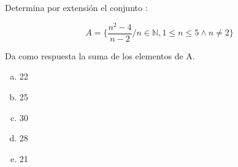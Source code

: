\documentclass[10pt, a5paper]{article}
\begin{document}
Determina por extensión el conjunto :

$$
A = \{  \dfrac{n^2 - 4}{n - 2} / n \in \mathbb{N}, 1 \le  n \le 5 \wedge n \ne 2 \}
$$

Da como respuesta la suma de los elementos de A.
\begin{enumerate}[a) ]
\item{22}
\item{25}
\item{30}
\item{28}
\item{21} %
\end{enumerate}
\end{document}

